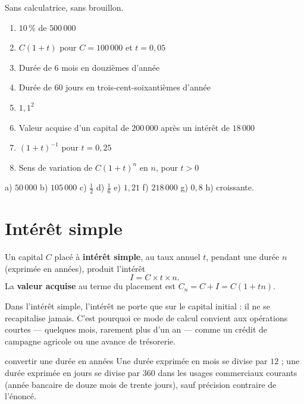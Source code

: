 \begin{automatismes}
Sans calculatrice, sans brouillon.

\begin{enumerate}[label=\textbf{\alph*)}, leftmargin=*, itemsep=0.25em]
  \item $10\,\%$ de $500\,000$
  \item $C(1+t)$ pour $C = 100\,000$ et $t = 0{,}05$
  \item Durée de $6$ mois en douzièmes d'année
  \item Durée de $60$ jours en trois-cent-soixantièmes d'année
  \item $1{,}1^{2}$
  \item Valeur acquise d'un capital de $200\,000$ après un intérêt de
        $18\,000$
  \item $(1+t)^{-1}$ pour $t = 0{,}25$
  \item Sens de variation de $C(1+t)^{n}$ en $n$, pour $t>0$
\end{enumerate}
\end{automatismes}

\begin{corrige}[automatismes]
a) $50\,000$ \quad b) $105\,000$ \quad c) $\frac12$ \quad d) $\frac16$
\quad e) $1{,}21$ \quad f) $218\,000$ \quad g) $0{,}8$ \quad h) croissante.
\end{corrige}

\section{Intérêt simple}

\begin{definition}
Un capital $C$ placé à \textbf{intérêt simple}, au taux annuel $t$, pendant
une durée $n$ (exprimée en années), produit l'intérêt
\[
  I = C \times t \times n .
\]
La \textbf{valeur acquise} au terme du placement est $C_{n} = C+I
= C(1+tn)$.
\end{definition}

\begin{remarque}
Dans l'intérêt simple, l'intérêt ne porte que sur le capital initial : il ne
se recapitalise jamais. C'est pourquoi ce mode de calcul convient aux
opérations courtes — quelques mois, rarement plus d'un an — comme un crédit
de campagne agricole ou une avance de trésorerie.
\end{remarque}

\begin{methode}{convertir une durée en années}
Une durée exprimée en mois se divise par $12$ ; une durée exprimée en jours
se divise par $360$ dans les usages commerciaux courants (année bancaire de
douze mois de trente jours), sauf précision contraire de l'énoncé.
\end{methode}

